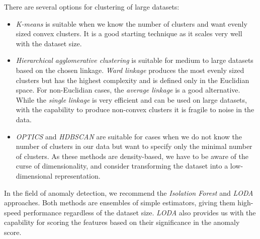 There are several options for clustering of large datasets:
\begin{itemize}
    \item \textit{K-means} is suitable when we know the number of clusters and want evenly sized convex clusters. It is a good starting technique as it scales very well with the dataset size.
    \item \textit{Hierarchical agglomerative clustering} is suitable for medium to large datasets based on the chosen linkage. \textit{Ward linkage} produces the most evenly sized clusters but has the highest complexity and is defined only in the Euclidian space. For non-Euclidian cases, the \textit{average linkage} is a good alternative. While the \textit{single linkage} is very efficient and can be used on large datasets, with the capability to produce non-convex clusters it is fragile to noise in the data.
    \item \textit{OPTICS} and \textit{HDBSCAN} are suitable for cases when we do not know the number of clusters in our data but want to specify only the minimal number of clusters. As these methods are density-based, we have to be aware of the curse of dimensionality, and consider transforming the dataset into a low-dimensional representation.
\end{itemize}

In the field of anomaly detection, we recommend the \textit{Isolation Forest} and \textit{LODA} approaches. Both methods are ensembles of simple estimators, giving them high-speed performance regardless of the dataset size. \textit{LODA} also provides us with the capability for scoring the features based on their significance in the anomaly score.
